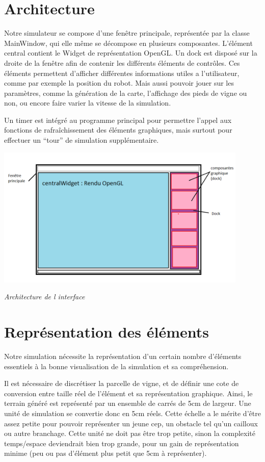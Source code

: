 \documentclass[usenames,dvipsnames]{report}
\begin{document}
    \section{Architecture}
    Notre simulateur se compose d’une fenêtre principale, représentée par la classe MainWindow, qui elle même se décompose en plusieurs composantes. L'élément central contient le Widget de représentation OpenGL. Un dock est disposé sur la droite de la fenêtre afin de contenir les différents éléments de contrôles. Ces éléments permettent d’afficher différentes informations utiles a l'utilisateur, comme par exemple la position du robot. Mais aussi pouvoir jouer sur les paramètres, comme la génération de la carte, l'affichage des pieds de vigne ou non, ou encore faire varier la vitesse de la simulation.


     Un timer est intégré au programme principal pour permettre l’appel aux fonctions de rafraîchissement des éléments graphiques, mais surtout pour effectuer un “tour” de simulation supplémentaire. 

    \includegraphics[width=12cm]{GUI-vitirover.png}


    \textit{Architecture de l interface} 

    \section{Représentation des éléments}
    Notre simulation nécessite la représentation d’un certain nombre d'éléments essentiels à la bonne visualisation de la simulation et sa compréhension.


    Il est nécessaire de discrétiser la parcelle de vigne, et de définir une cote de conversion entre taille réel de l'élément et sa représentation graphique.  Ainsi, le terrain généré est représenté par un ensemble de carrés de 5cm de largeur. Une unité de simulation se convertie donc en 5cm réels. Cette échelle a le mérite d'être assez petite pour pouvoir représenter un jeune cep, un obstacle tel qu’un cailloux ou autre branchage. Cette unité ne doit pas être trop petite, sinon la complexité temps/espace deviendrait bien trop grande, pour un gain de représentation minime (peu ou pas d'élément plus petit que 5cm à représenter).
\end{document}

